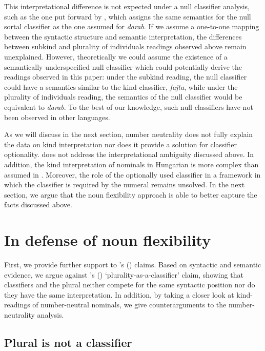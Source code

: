 \documentclass[output=paper]{langscibook}
\begin{document}
This interpretational difference is not expected under a null classifier analysis, such as the one put forward by \citet{csirmaz-dekany-14}, which assigns the same semantics for the null sortal classifier as the one assumed for \textit{darab}. If we assume a one-to-one mapping between the syntactic structure and semantic interpretation, the differences between subkind and plurality of individuals readings observed above remain unexplained. However, theoretically we could assume the existence of a semantically underspecified null classifier which could potentially derive the readings observed in this paper: under the subkind reading, the null classifier could have a semantics similar to the kind-classifier, \textit{fajta}, while under the plurality of individuals reading, the semantics of the null classifier would be equivalent to \textit{darab}. To the best of our knowledge, such null classifiers have not been observed in other languages. 

As we will discuss in the next section, number neutrality does not fully explain the data on kind interpretation nor does it provide a solution for classifier optionality. \citet{erbach-etal-19} does not address the interpretational ambiguity discussed above.  In addition, the kind interpretation of nominals in Hungarian is more complex than assumed in \citet{erbach-etal-19}. Moreover, the role of the optionally used classifier in a framework in which the classifier is required by the numeral remains unsolved. 
In the next section, we argue that the noun flexibility approach is able to better capture the facts discussed above. 

\section{In defense of noun flexibility} \label{schv-nem:sec:3}
 
First, we provide further support to  \citeauthor{schvarcz-rothstein-17}’s (\citeyear{schvarcz-rothstein-17}) claims. Based on syntactic and semantic evidence, we argue against \citeauthor{csirmaz-dekany-14}'s (\citeyear{csirmaz-dekany-14}) `plurality-as-a-classifier' claim, showing that classifiers and the plural neither compete for the same syntactic position nor do they have the same interpretation. In addition, by taking a closer look at kind-readings of number-neutral nominals, we give counterarguments to the number-neutrality analysis. 

\subsection{Plural is not a classifier} \label{schv-nem:sec:3.1}
\end{document}
